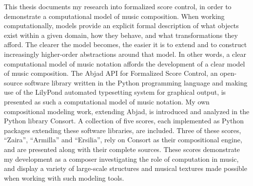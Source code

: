\noindent This thesis documents my research into formalized
score control, in order to demonstrate a computational model of music
composition. When working computationally, models provide an explicit formal
description of what objects exist within a given domain, how they behave, and
what transformations they afford. The clearer the model becomes, the easier it
is to extend and to construct increasingly higher-order abstractions around
that model. In other words, a clear computational model of music notation
affords the development of a clear model of music composition. The Abjad API
for Formalized Score Control, an open-source software library written in the
Python programming language and making use of the LilyPond automated
typesetting system for graphical output, is presented as such a computational
model of music notation. My own compositional modeling work, extending Abjad,
is introduced and analyzed in the Python library Consort. A collection of five
scores, each implemented as Python packages extending these software libraries,
are included. Three of these scores, \enquote{Zaira}, \enquote{Armilla} and
\enquote{Ersilia}, rely on Consort as their compositional engine, and are
presented along with their complete sources. These scores demonstrate my
development as a composer investigating the role of computation in music, and
display a variety of large-scale structures and musical textures made possible
when working with such modeling tools.